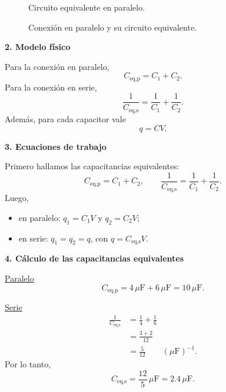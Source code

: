 \documentclass[11pt]{article}
\begin{document}
\begin{figure}[h!]
\begin{minipage}{0.48\textwidth}

        \vspace{0.35em}
        {\footnotesize Circuito equivalente en paralelo.}
    \end{minipage}
    \caption{Conexi\'on en paralelo y su circuito equivalente.}
\end{figure}

\textbf{2. Modelo f\'isico}

Para la conexi\'on en paralelo,
\begin{equation*}
    C_{\text{eq,p}}=C_1+C_2.
\end{equation*}
Para la conexi\'on en serie,
\begin{equation*}
    \frac{1}{C_{\text{eq,s}}}=\frac{1}{C_1}+\frac{1}{C_2}.
\end{equation*}
Adem\'as, para cada capacitor vale
\begin{equation*}
    q=CV.
\end{equation*}

\textbf{3. Ecuaciones de trabajo}

Primero hallamos las capacitancias equivalentes:
\begin{equation*}
    C_{\text{eq,p}}=C_1+C_2,
    \qquad
    \frac{1}{C_{\text{eq,s}}}=\frac{1}{C_1}+\frac{1}{C_2}.
\end{equation*}
Luego,
\begin{itemize}
    \item en paralelo: $q_1=C_1V$ y $q_2=C_2V$;
    \item en serie: $q_1=q_2=q$, con $q=C_{\text{eq,s}}V$.
\end{itemize}

\textbf{4. C\'alculo de las capacitancias equivalentes}

\underline{Paralelo}
\begin{equation*}
    C_{\text{eq,p}}=4\,\mu\text{F}+6\,\mu\text{F}=10\,\mu\text{F}.
\end{equation*}

\underline{Serie}
\begin{align*}
    \frac{1}{C_{\text{eq,s}}}
    &=\frac{1}{4}+\frac{1}{6}\\
    &=\frac{3+2}{12}\\
    &=\frac{5}{12}
    \qquad (\mu\text{F})^{-1}.
\end{align*}
Por lo tanto,
\begin{equation*}
    C_{\text{eq,s}}=\frac{12}{5}\,\mu\text{F}=2.4\,\mu\text{F}.
\end{equation*}
\end{document}
